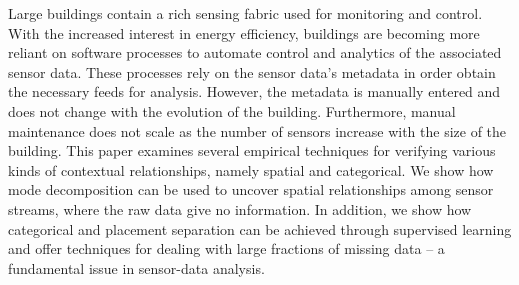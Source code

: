 

Large buildings contain a rich sensing fabric used for monitoring and control.
With the increased interest in energy efficiency, buildings are becoming more reliant on software processes
to automate control and analytics of the associated sensor data.  These processes rely on the sensor data's
metadata in order obtain the necessary feeds for analysis.  However, the metadata is manually entered and 
does not change with the evolution of the building.  Furthermore, manual maintenance does not scale as the number
of sensors increase with the size of the building.  %
This paper examines several empirical techniques for verifying various
kinds of contextual relationships, namely spatial and categorical.  We show how mode decomposition
can be used to uncover spatial relationships among sensor streams, where the raw data give no information.
In addition, we show how categorical and placement  
separation can be achieved through supervised learning and offer techniques for dealing with 
large fractions of missing data -- a fundamental issue in sensor-data analysis.